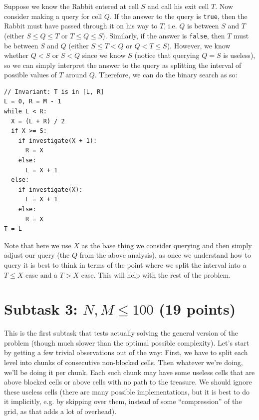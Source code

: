 \documentclass[12pt]{article}
\begin{document}
Suppose we know the Rabbit entered at cell $S$ and call his exit cell $T$. Now consider making a query for cell $Q$. If the answer to the query is \verb|true|, then the Rabbit must have passed through it on his way to $T$, i.e. $Q$ is between $S$ and $T$ (either $S \leq Q \leq T$ or $T \leq Q \leq S$). Similarly, if the answer is \verb|false|, then $T$ must be between $S$ and $Q$ (either $S \leq T < Q$ or $Q < T \leq S$). However, we know whether $Q < S$ or $S < Q$ since we know $S$ (notice that querying $Q = S$ is useless), so we can simply interpret the answer to the query as splitting the interval of possible values of $T$ around $Q$. Therefore, we can do the binary search as so:

\vspace{1em}

\begin{verbatim}
// Invariant: T is in [L, R]
L = 0, R = M - 1
while L < R:
  X = (L + R) / 2
  if X >= S:
    if investigate(X + 1):
      R = X
    else:
      L = X + 1
  else:
    if investigate(X):
      L = X + 1
    else:
      R = X
T = L
\end{verbatim}

\vspace{1em}

Note that here we use $X$ as the base thing we consider querying and then simply adjust our query (the $Q$ from the above analysis), as once we understand how to query it is best to think in terms of the point where we split the interval into a $T \leq X$ case and a $T > X$ case. This will help with the rest of the problem.

\section*{Subtask 3: $N, M \leq 100$ (19 points)}

This is the first subtask that tests actually solving the general version of the problem (though much slower than the optimal possible complexity). Let's start by getting a few trivial observations out of the way: First, we have to split each level into chunks of consecutive non-blocked cells. Then whatever we're doing, we'll be doing it per chunk. Each such chunk may have some useless cells that are above blocked cells or above cells with no path to the treasure. We should ignore these useless cells (there are many possible implementations, but it is best to do it implicitly, e.g. by skipping over them, instead of some ``compression'' of the grid, as that adds a lot of overhead).
\end{document}
